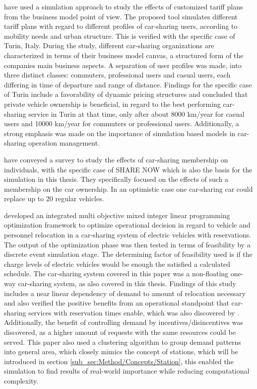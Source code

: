  have used a simulation approach to study the effects of customized
tariff plans from the business model point of view. The proposed tool simulates different tariff plans
with regard to different profiles of car-sharing users, according to mobility needs and urban structure.
This is verified with the specific case of Turin, Italy. During the study, different car-sharing organizations
are characterized in terms of their business model canvas, a structured form of the companies main business
aspects. A separation of user profiles was made, into three distinct classes: commuters, professional users
and casual users, each differing in time of departure and range of distance. Findings for the specific
case of Turin include a favorability of dynamic pricing structures and concluded that private vehicle ownership
is beneficial, in regard to the best performing car-sharing service in Turin at that time, only after about 8000 km/year
for casual users and 10000 km/year for commuters or professional users. Additionally, a strong emphasis was 
made on the importance of simulation based models in car-sharing operation management.

 have conveyed a survey to study the effects of car-sharing
membership on individuals, with the specific case of SHARE NOW which is also the basis
for the simulation in this thesis. They specifically focused on the effects of such a 
membership on the car ownership. In an optimistic case one car-sharing car could replace
up to 20 regular vehicles. 

 developed an integrated multi objective mixed integer
linear programming optimization framework to optimize operational decision in regard to
vehicle and personnel relocation in a car-sharing system of electric vehicles with reservations. The output of 
the optimization phase was then tested in terms of feasibility by a discrete event simulation
stage. The determining factor of feasibility used is if the charge levels of electric vehicles
would be enough the satisfied a calculated schedule. The car-sharing system covered in this paper
was a non-floating one-way car-sharing system, as also covered in this thesis. Findings of this
study includes a near linear dependency of demand to amount of relocation necessary and also
verified the positive benefits from an operational standpoint that car-sharing services with reservation
times enable, which was also discovered by . Additionally, the benefit of controlling
demand by incentives/disincentives was discovered, as a higher amount of requests with the same 
resources could be served. This paper also used a clustering algorithm to group demand patterns into
general area, which closely mimics the concept of stations, which will be introduced in section \ref{sub_sec:Method/Concepts/Station},
this enabled the simulation to find results of real-world importance while reducing
computational complexity.
